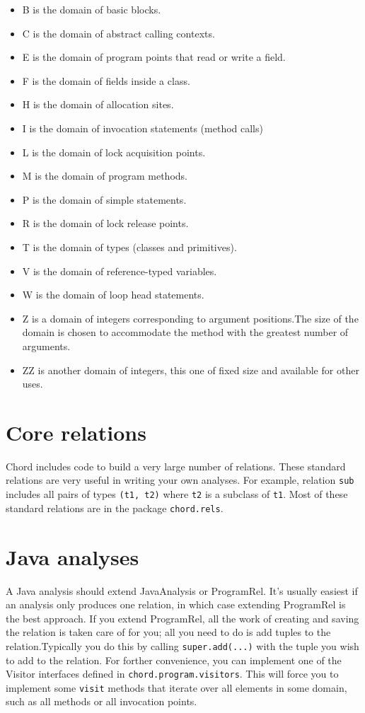 \begin{itemize}
\item
B is the domain of basic blocks.
\item
C is the domain of abstract calling contexts.
\item
E is the domain of program points that read or write a field.
\item
F is the domain of fields inside a class.
\item
H is the domain of allocation sites.
\item
I is the domain of invocation statements (method calls)
\item
L is the domain of lock acquisition points.
\item
M is the domain of program methods.
\item
P is the domain of simple statements. %
\item
R is the domain of lock release points.
\item
T is the domain of types (classes and primitives).
\item
V is the domain of reference-typed variables.
\item
W is the domain of loop head statements. %
\item
Z is a domain of integers corresponding to argument positions.The size of the domain is chosen to 
accommodate the method with the greatest number of arguments.
\item
ZZ is another domain of integers, this one of fixed size and available for other uses.
\end{itemize}

\section{Core relations}

Chord includes code to build a very large number of relations. These standard relations
are very useful in writing your own analyses.
For example, relation \texttt{sub} includes all pairs of types \texttt{(t1, t2)} where \texttt{t2} is a subclass of \texttt{t1}.
Most of these standard relations are in the package \texttt{chord.rels}.

\section{Java analyses}

A Java analysis should extend JavaAnalysis or ProgramRel.  It's usually easiest if an analysis
only produces one relation, in which case extending ProgramRel is the best approach.
If you extend ProgramRel, all the work of creating and saving the relation is taken care of for you;
all you need to do is add tuples to the relation.Typically you do this by calling
\texttt{super.add(...)} with the tuple you wish to add to the relation.
For forther convenience, you can implement one of the Visitor interfaces defined in 
\texttt{chord.program.visitors}.  This will force you to implement some \texttt{visit} methods that iterate over
all elements in some domain, such as all methods or all invocation points. 

